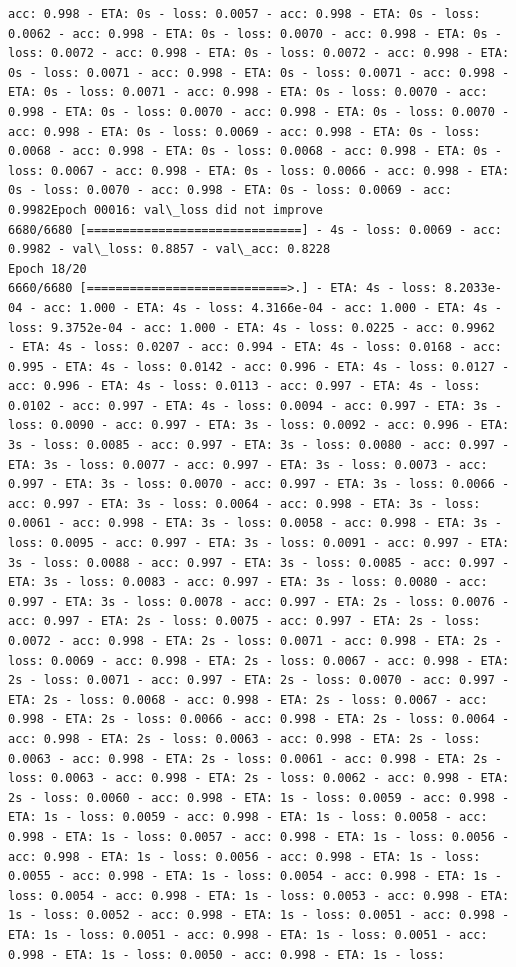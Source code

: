 \documentclass[11pt]{article}
\begin{document}
\begin{Verbatim}[commandchars=\\\{\}]
acc: 0.998 - ETA: 0s - loss: 0.0057 - acc: 0.998 - ETA: 0s - loss: 0.0062 - acc: 0.998 - ETA: 0s - loss: 0.0070 - acc: 0.998 - ETA: 0s - loss: 0.0072 - acc: 0.998 - ETA: 0s - loss: 0.0072 - acc: 0.998 - ETA: 0s - loss: 0.0071 - acc: 0.998 - ETA: 0s - loss: 0.0071 - acc: 0.998 - ETA: 0s - loss: 0.0071 - acc: 0.998 - ETA: 0s - loss: 0.0070 - acc: 0.998 - ETA: 0s - loss: 0.0070 - acc: 0.998 - ETA: 0s - loss: 0.0070 - acc: 0.998 - ETA: 0s - loss: 0.0069 - acc: 0.998 - ETA: 0s - loss: 0.0068 - acc: 0.998 - ETA: 0s - loss: 0.0068 - acc: 0.998 - ETA: 0s - loss: 0.0067 - acc: 0.998 - ETA: 0s - loss: 0.0066 - acc: 0.998 - ETA: 0s - loss: 0.0070 - acc: 0.998 - ETA: 0s - loss: 0.0069 - acc: 0.9982Epoch 00016: val\_loss did not improve
6680/6680 [==============================] - 4s - loss: 0.0069 - acc: 0.9982 - val\_loss: 0.8857 - val\_acc: 0.8228
Epoch 18/20
6660/6680 [============================>.] - ETA: 4s - loss: 8.2033e-04 - acc: 1.000 - ETA: 4s - loss: 4.3166e-04 - acc: 1.000 - ETA: 4s - loss: 9.3752e-04 - acc: 1.000 - ETA: 4s - loss: 0.0225 - acc: 0.9962    - ETA: 4s - loss: 0.0207 - acc: 0.994 - ETA: 4s - loss: 0.0168 - acc: 0.995 - ETA: 4s - loss: 0.0142 - acc: 0.996 - ETA: 4s - loss: 0.0127 - acc: 0.996 - ETA: 4s - loss: 0.0113 - acc: 0.997 - ETA: 4s - loss: 0.0102 - acc: 0.997 - ETA: 4s - loss: 0.0094 - acc: 0.997 - ETA: 3s - loss: 0.0090 - acc: 0.997 - ETA: 3s - loss: 0.0092 - acc: 0.996 - ETA: 3s - loss: 0.0085 - acc: 0.997 - ETA: 3s - loss: 0.0080 - acc: 0.997 - ETA: 3s - loss: 0.0077 - acc: 0.997 - ETA: 3s - loss: 0.0073 - acc: 0.997 - ETA: 3s - loss: 0.0070 - acc: 0.997 - ETA: 3s - loss: 0.0066 - acc: 0.997 - ETA: 3s - loss: 0.0064 - acc: 0.998 - ETA: 3s - loss: 0.0061 - acc: 0.998 - ETA: 3s - loss: 0.0058 - acc: 0.998 - ETA: 3s - loss: 0.0095 - acc: 0.997 - ETA: 3s - loss: 0.0091 - acc: 0.997 - ETA: 3s - loss: 0.0088 - acc: 0.997 - ETA: 3s - loss: 0.0085 - acc: 0.997 - ETA: 3s - loss: 0.0083 - acc: 0.997 - ETA: 3s - loss: 0.0080 - acc: 0.997 - ETA: 3s - loss: 0.0078 - acc: 0.997 - ETA: 2s - loss: 0.0076 - acc: 0.997 - ETA: 2s - loss: 0.0075 - acc: 0.997 - ETA: 2s - loss: 0.0072 - acc: 0.998 - ETA: 2s - loss: 0.0071 - acc: 0.998 - ETA: 2s - loss: 0.0069 - acc: 0.998 - ETA: 2s - loss: 0.0067 - acc: 0.998 - ETA: 2s - loss: 0.0071 - acc: 0.997 - ETA: 2s - loss: 0.0070 - acc: 0.997 - ETA: 2s - loss: 0.0068 - acc: 0.998 - ETA: 2s - loss: 0.0067 - acc: 0.998 - ETA: 2s - loss: 0.0066 - acc: 0.998 - ETA: 2s - loss: 0.0064 - acc: 0.998 - ETA: 2s - loss: 0.0063 - acc: 0.998 - ETA: 2s - loss: 0.0063 - acc: 0.998 - ETA: 2s - loss: 0.0061 - acc: 0.998 - ETA: 2s - loss: 0.0063 - acc: 0.998 - ETA: 2s - loss: 0.0062 - acc: 0.998 - ETA: 2s - loss: 0.0060 - acc: 0.998 - ETA: 1s - loss: 0.0059 - acc: 0.998 - ETA: 1s - loss: 0.0059 - acc: 0.998 - ETA: 1s - loss: 0.0058 - acc: 0.998 - ETA: 1s - loss: 0.0057 - acc: 0.998 - ETA: 1s - loss: 0.0056 - acc: 0.998 - ETA: 1s - loss: 0.0056 - acc: 0.998 - ETA: 1s - loss: 0.0055 - acc: 0.998 - ETA: 1s - loss: 0.0054 - acc: 0.998 - ETA: 1s - loss: 0.0054 - acc: 0.998 - ETA: 1s - loss: 0.0053 - acc: 0.998 - ETA: 1s - loss: 0.0052 - acc: 0.998 - ETA: 1s - loss: 0.0051 - acc: 0.998 - ETA: 1s - loss: 0.0051 - acc: 0.998 - ETA: 1s - loss: 0.0051 - acc: 0.998 - ETA: 1s - loss: 0.0050 - acc: 0.998 - ETA: 1s - loss: 
\end{Verbatim}
\end{document}
